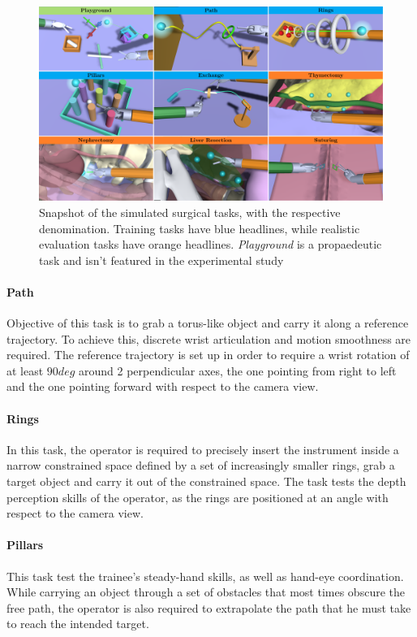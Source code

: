 \documentclass[../main.tex]{subfiles}
\begin{document}
\begin{figure}
    \centering
    \includegraphics[width=\textwidth]{images/tasks_panel.png}
    \caption{Snapshot of the simulated surgical tasks, with the respective denomination. Training tasks have blue headlines, while realistic evaluation tasks have orange headlines. \textit{Playground} is a propaedeutic task and isn't featured in the experimental study}
    \label{fig:taskspanel}
\end{figure}

\paragraph{Path} Objective of this task is to grab a torus-like object and carry it along a reference trajectory. To achieve this, discrete wrist articulation and motion smoothness are required. The reference trajectory is set up in order to require a wrist rotation of at least $90 \unit{deg}$ around 2 perpendicular axes, the one pointing from right to left and the one pointing forward with respect to the camera view.
\paragraph{Rings} In this task, the operator is required to precisely insert the instrument inside a narrow constrained space defined by a set of increasingly smaller rings, grab a target object and carry it out of the constrained space. The task tests the depth perception skills of the operator, as the rings are positioned at an angle with respect to the camera view.
\paragraph{Pillars} This task test the trainee's steady-hand skills, as well as hand-eye coordination. While carrying an object through a set of obstacles that most times obscure the free path, the operator is also required to extrapolate the path that he must take to reach the intended target.
\end{document}
